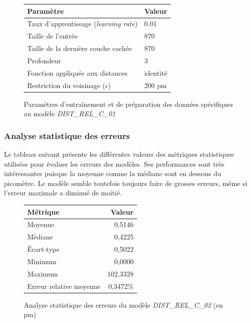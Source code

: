 \begin{figure}[!h]
	\centering
	\begin{tabular}{|l|l|}
		\hline
		\textbf{Paramètre} & \textbf{Valeur} \\ \hline
		Taux d'apprentissage (\emph{learning rate}) & 0.01 \\ \hline
		Taille de l'entrée & 870 \\ \hline
		Taille de la dernière couche cachée & 870 \\ \hline
		Profondeur & 3 \\ \hline
		Fonction appliquée aux distances & identité \\ \hline
		Restriction du voisinage ($\epsilon$) & 200 pm \\ \hline
	\end{tabular}

	\caption{Paramètres d'entraînement et de préparation des données spécifiques au modèle \emph{DIST\_REL\_C\_01}}
\end{figure}

\subsubsection{Analyse statistique des erreurs}
\par Le tableau suivant présente les différentes valeurs des métriques statistiques utilisées pour évaluer les erreurs des modèles. Ses performances sont très intéressantes puisque la moyenne comme la médiane sont en dessous du picomètre. Le modèle semble toutefois toujours faire de grosses erreurs, même si l'erreur maximale a diminué de moitié.

\begin{figure}[!h]
	\centering
	\begin{tabular}{|l|r|}
		\hline
		\textbf{Métrique} & \textbf{Valeur} \\ \hline
		Moyenne & 0,5146 \\ \hline
		Médiane & 0,4225 \\ \hline
		Écart-type & 0,5022 \\ \hline
		Minimum & 0,0000 \\ \hline
		Maximum & 102,3328\\ \hline
		Erreur relative moyenne & 0,3472\% \\ \hline
	\end{tabular}
	
	\caption{Analyse statistique des erreurs du modèle \emph{DIST\_REL\_C\_02} (en pm)}
\end{figure}

